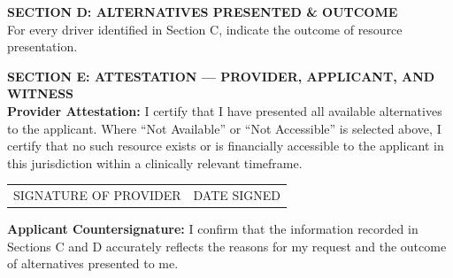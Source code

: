 \documentclass[10pt]{article}
\begin{document}
\vspace{1em}
\noindent\textbf{\large SECTION D: ALTERNATIVES PRESENTED \& OUTCOME}\\[0.2em]
For every driver identified in Section C, indicate the outcome of resource presentation.

\vspace{0.5em}

\vspace{1em}
\noindent\textbf{\large SECTION E: ATTESTATION --- PROVIDER, APPLICANT, AND WITNESS}\\[0.5em]
\noindent\textbf{Provider Attestation:} I certify that I have presented all available alternatives to the applicant. Where ``Not Available'' or ``Not Accessible'' is selected above, I certify that no such resource exists or is financially accessible to the applicant in this jurisdiction within a clinically relevant timeframe.

\vspace{0.5em}
\noindent\begin{tabularx}{\textwidth}{X X}
SIGNATURE OF PROVIDER\hrulefill & DATE SIGNED\hrulefill \\
\end{tabularx}

\vspace{1em}
\noindent\textbf{Applicant Countersignature:} I confirm that the information recorded in Sections C and D accurately reflects the reasons for my request and the outcome of alternatives presented to me.
\end{document}
